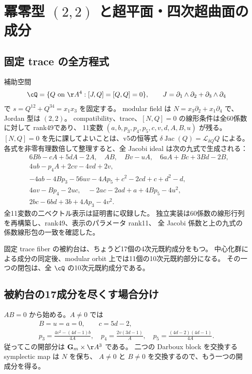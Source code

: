 \section{冪零型 \texorpdfstring{$(2,2)$}{(2,2)} と超平面・四次超曲面の成分}\label{sec:22}
\subsection{固定 trace の全方程式}
補助空間
\[
 \cQ=\{Q\text{ on }\AA^4:[J,Q]=[Q,Q]=0\},\qquad
 J=\partial_1\wedge\partial_2+\partial_3\wedge\partial_4
\]
で $s=Q^{12}+Q^{34}=x_1x_3$ を固定する。
modular field は $N=x_3\partial_2+x_1\partial_4$ で、Jordan 型は $(2,2)$。
compatibility、trace、$[N,Q]=0$ の線形条件は全60係数に対して rank49であり、
11変数 $(a,b,p_3,p_4,p_5,c,v,d,A,B,u)$ が残る。
$[N,Q]=0$ を先に課してよいことは、v5の恒等式
$\delta\operatorname{Jac}(Q)=\mathcal L_{\delta Q}Q$ による。
各式を非零有理数倍して整理すると、全 Jacobi ideal は次の九式で生成される：
\begin{align*}
 &6Bb-cA+5dA-2A,\quad AB,\quad Bv-uA,\quad6aA+Bc+3Bd-2B,\\
 &4ub-p_4A+2cv-4vd+2v,\\
 &-4ab-4Bp_3-56uv-4Ap_5+c^2-2cd+c+d^2-d,\\
 &4av-Bp_4-2uc,\quad-2ac-2ad+a+4Bp_5-4u^2,\\
 &2bc-6bd+3b+4Ap_3-4v^2.
\end{align*}
全11変数の二ベクトル表示は証明書に収録した。
独立実装は60係数の線形行列を再構築し、rank49、表示のパラメータ rank11、
全 Jacobi 係数と上の九式の係数線形包の一致を確認した。

\begin{theorem}\label{thm:22fiber}
固定 trace fiber の被約台は、ちょうど17個の4次元既約成分をもつ。
中心化群による成分の同定後、modular orbit 上では11個の10次元既約部分になる。
その一つの閉包は、全 $\cQ$ の10次元既約成分である。
\end{theorem}

\subsection{被約台の17成分を尽くす場合分け}
$AB=0$ から始める。$A\ne0$ では
\begin{gather*}
 B=u=a=0,\qquad c=5d-2,\\
 p_3=\frac{4v^2-(4d-1)b}{4A},\quad
 p_4=\frac{2v(3d-1)}{A},\quad
 p_5=\frac{(4d-2)(4d-1)}{4A}.
\end{gather*}
従ってこの開部分は $\mathbf G_m\times\AA^3$ である。
二つの Darboux block を交換する symplectic map は $N$ を保ち、
$A\ne0$ と $B\ne0$ を交換するので、もう一つの開成分を得る。

